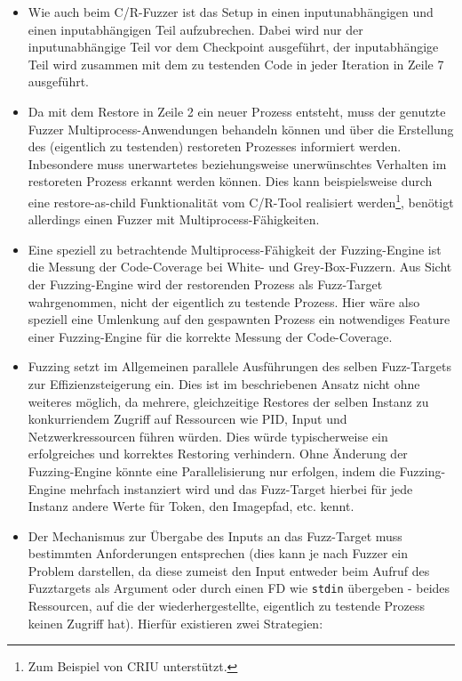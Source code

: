 \documentclass[a4paper]{article}
\begin{document}
\begin{itemize}
    \item Wie auch beim C/R-Fuzzer ist das Setup in einen inputunabhängigen und einen inputabhängigen Teil aufzubrechen. Dabei wird nur der inputunabhängige Teil vor dem Checkpoint ausgeführt, der inputabhängige Teil wird zusammen mit dem zu testenden Code in jeder Iteration in Zeile 7 ausgeführt.
    \item Da mit dem Restore in Zeile 2 ein neuer Prozess entsteht, muss der genutzte Fuzzer Multiprocess-Anwendungen behandeln können und über die Erstellung des (eigentlich zu testenden) restoreten Prozesses informiert werden. 
        Inbesondere muss unerwartetes beziehungsweise unerwünschtes Verhalten im restoreten Prozess erkannt werden können. 
        Dies kann beispielsweise durch eine restore-as-child Funktionalität vom C/R-Tool realisiert werden\footnote{Zum Beispiel von CRIU unterstützt.}, benötigt allerdings einen Fuzzer mit Multiprocess-Fähigkeiten.
    \item Eine speziell zu betrachtende Multiprocess-Fähigkeit der Fuzzing-Engine ist die Messung der Code-Coverage bei White- und Grey-Box-Fuzzern. Aus Sicht der Fuzzing-Engine wird der restorenden Prozess als Fuzz-Target wahrgenommen, nicht der eigentlich zu testende Prozess. Hier wäre also speziell eine Umlenkung auf den gespawnten Prozess ein notwendiges Feature einer Fuzzing-Engine für die korrekte Messung der Code-Coverage.
    \item Fuzzing setzt im Allgemeinen parallele Ausführungen des selben Fuzz-Targets zur Effizienzsteigerung ein. 
        Dies ist im beschriebenen Ansatz nicht ohne weiteres möglich, da mehrere, gleichzeitige Restores der selben Instanz zu konkurriendem Zugriff auf Ressourcen wie PID, Input und Netzwerkressourcen führen würden. Dies würde typischerweise ein erfolgreiches und korrektes Restoring verhindern. 
        Ohne Änderung der Fuzzing-Engine könnte eine Parallelisierung nur erfolgen, indem die Fuzzing-Engine mehrfach instanziert wird und das Fuzz-Target hierbei für jede Instanz andere Werte für Token, den Imagepfad, etc. kennt.
    \item Der Mechanismus zur Übergabe des Inputs an das Fuzz-Target muss bestimmten Anforderungen entsprechen (dies kann je nach Fuzzer ein Problem darstellen, da diese zumeist den Input entweder beim Aufruf des Fuzztargets als Argument oder durch einen FD wie \texttt{stdin} übergeben - beides Ressourcen, auf die der wiederhergestellte, eigentlich zu testende Prozess keinen Zugriff hat). Hierfür existieren zwei Strategien:

\end{itemize}
\end{document}
